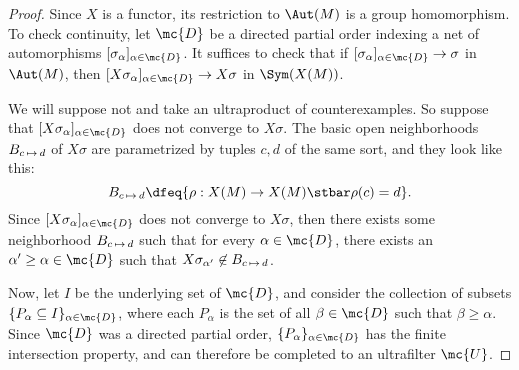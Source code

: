 \begin{proof}
  Since $X$ is a functor, its restriction to $\Aut(M)$ is a group homomorphism. To check continuity, let $\mc{D}$ be a directed partial order indexing a net of automorphisms $[\sigma_{\alpha}]_{\alpha \in \mc{D}}$. It suffices to check that if $[\sigma_{\alpha}]_{\alpha \in \mc{D}} \to \sigma$ in $\Aut(M)$, then $[X \sigma_{\alpha}]_{\alpha \in \mc{D}} \to X \sigma$ in $\Sym(X(M))$.

  We will suppose not and take an ultraproduct of counterexamples. So suppose that $[X \sigma_{\alpha}]_{\alpha \in \mc{D}}$ does not converge to $X \sigma$. The basic open neighborhoods $B_{c \hspace{0.5mm} \mapsto \hspace{0.5mm} d}$ of $X \sigma$ are parametrized by tuples $c,d$ of the same sort, and they look like this:
  $$
B_{c \hspace{0.5mm} \mapsto \hspace{0.5mm} d} \dfeq \{\rho : X(M) \to X(M) \stbar \rho(c) = d\}.
$$
Since $[X \sigma_{\alpha}]_{\alpha \in \mc{D}}$ does not converge to $X \sigma$, then there exists some neighborhood $B_{c \hspace{0.5mm} \mapsto \hspace{0.5mm} d}$ such that for every $\alpha \in \mc{D}$, there exists an $\alpha' \geq \alpha \in \mc{D}$ such that $X \sigma_{\alpha'} \not \in B_{c \hspace{0.5mm} \mapsto \hspace{0.5mm} d}$.

Now, let $I$ be the underlying set of $\mc{D}$, and consider the collection of subsets $\{P_{\alpha} \subseteq I\}_{\alpha \in \mc{D}}$, where each $P_{\alpha}$ is the set of all $\beta \in \mc{D}$ such that $\beta \geq \alpha$. Since $\mc{D}$ was a directed partial order, $\{P_{\alpha}\}_{\alpha \in \mc{D}}$ has the finite intersection property, and can therefore be completed to an ultrafilter $\mc{U}$.


\end{proof}

